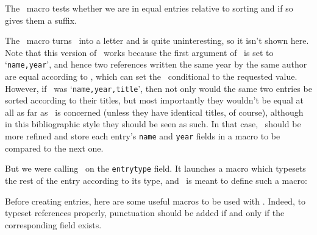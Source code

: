 The \tcmd\comparentries\ macro tests whether we are in equal entries
relative to sorting and if so gives them a suffix.

\verbatim
\newcount\sameentrycount
\def\compareentries{%
  \ifequalentry
    \advance\sameentrycount1
    \WriteImmediateInfo{%
      \noexpand\expandafter\def
        \noexpand\csname\EntryKey @suffix\noexpand\endcsname
        {\toletter}}%
  \else \sameentrycount=0 \fi
  }
\endverbatim

\noindent The \tcmd\toletter\ macro turns \tcmd\sameentrycount\
into a letter and is quite uninteresting, so it isn't shown here.
Note that this version of \tcmd\compareentries\ works because 
the first argument of \tcmd\SortOrder\ is set to `\texttt{name,year}',
and hence two references written the same year by the same author
are equal according to \lib, which can set the \tcmd\ifequelentry\
conditional to the requested value. However, if \tcmd\SortOrder\
was `\texttt{name,year,title}', then not only would the same two 
entries be sorted according to their titles,
but most importantly they wouldn't be equal at all as far as \lib\
is concerned (unless they have identical titles, of course),
although in this bibliographic style they should be
seen as such. In that case, \tcmd\compareentries\ should be more
refined and store each entry's \texttt{name} and \texttt{year} fields
in a macro to be compared to the next one.

But we were calling \tcmd\typesetref\ on the \texttt{entrytype} field.
It launches a macro which typesets the rest of the entry according
to its type, and \tcmd\createtype\ is meant to define such a macro:

\verbatim
\def\typesetref#1{%
  \ifcsname#1@entrytype\endcsname
    \csname#1@entrytype\endcsname
  \else
    \errmessage{Unknown entry type: `#1'}%
  \fi
  }
\def\createtype#1{%
  \expandafter\def\csname#1@entrytype\endcsname
  }
\endverbatim

Before creating entries, here are some useful macros to be used with
\tcmd\TypesetField. Indeed, to typeset references properly, punctuation
should be added if and only if the corresponding field exists.

\verbatim
\def\booktitle#1{\setbooktitle{\RetrieveField{#1}}}
\def\setbooktitle#1{\italics{#1}}
\def\articletitle#1{\setarticletitle{\RetrieveField{#1}}}
\def\setarticletitle#1{`#1'}
\def\addcomma#1{, #1}
\def\addjournal#1{\addcomma{{\setbooktitle{#1}}}}
\def\addcolon#1{: #1}
\def\addpar#1{(#1)}
\def\addbook#1{, in \setbooktitle{#1}}
\def\addeditor#1{%
  \RetrieveFieldIn{editornumber}\tempcount
  , edited by \ReadEditor\makeedname}
\endverbatim

